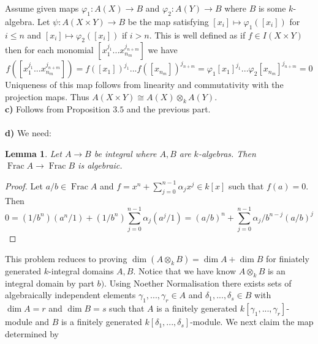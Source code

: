 \documentclass[12pt]{article}
\numberwithin{thm}{subsection}
\numberwithin{defn}{subsection}
\newtheorem{lemma}{Lemma}
\numberwithin{lemma}{subsection}
\numberwithin{example}{subsection}
\numberwithin{notation}{subsection}
\numberwithin{cor}{subsection}
\numberwithin{remark}{subsection}
\numberwithin{condition}{subsection}
\numberwithin{question}{subsection}
\numberwithin{construction}{subsection}
\numberwithin{construction}{subsection}
\numberwithin{construction}{subsection}
\newcommand{\lto}{\longrightarrow}
\begin{document}
Assume given maps $\varphi_1:A(X) \lto B$ and $\varphi_2: A(Y) \lto B$ where $B$ is some $k$-algebra. Let $\psi: A(X \times Y) \lto B$ be the map satisfying $[x_i] \mapsto \varphi_1([x_i])$ for $i \leq n$ and $[x_i] \mapsto \varphi_2([x_i])$ if $i > n$. This is well defined as if $f \in I(X \times Y)$ then for each monomial $[x_1^{j_1}...x_{n_m}^{j_{n+m}}]$ we have
\[f([x_1^{j_1}...x_{n_m}^{j_{n+m}}]) = f([x_1])^{j_1}...f([x_{n_m}])^{j_{n+m}} = \varphi_1 [x_1]^{j_1}...\varphi_2[x_{n_m}]^{j_{n+m}} = 0\]
Uniqueness of this map follows from linearity and commutativity with the projection maps. Thus $A(X \times Y) \cong A(X )\otimes_k A(Y)$.\\
%
\textbf{c)} Follows from Proposition $3.5$ and the previous part.\\\\
%
\textbf{d)} 
We need:
%
\begin{lemma}
\label{lem:int_implies_alg} Let $A \lto B$ be integral where $A,B$ are $k$-algebras. Then $\operatorname{Frac}A \lto \operatorname{Frac}B$ is algebraic.
\end{lemma}
\begin{proof}
Let $a/b \in \operatorname{Frac}A$ and $f = x^n + \sum_{j = 0}^{n-1}\alpha_j x^j \in k[x]$ such that $f(a) = 0$. Then
\[0 = (1/b^n)(a^n/1) + (1/b^n)\sum_{j = 0}^{n-1}\alpha_j(a^j/1) = (a/b)^n + \sum_{j = 0}^{n-1}\alpha_j/b^{n-j} (a/b)^j\]
\end{proof}
%
This problem reduces to proving $\operatorname{dim}(A \otimes_k B) = \operatorname{dim}A + \operatorname{dim}B$ for finiately generated $k$-integral domains $A,B$. Notice that we have know $A \otimes_k B$ is an integral domain by part $b)$. Using Noether Normalisation there exists sets of algebraically independent elements $\gamma_1,...,\gamma_r \in A$ and $\delta_1,...,\delta_s \in B$ with $\operatorname{dim}A = r$ and $\operatorname{dim}B = s$ such that $A$ is a finitely generated $k[\gamma_1,...,\gamma_r]$-module and $B$ is a finitely generated $k[\delta_1,...,\delta_s]$-module. We next claim the map determined by
\end{document}
